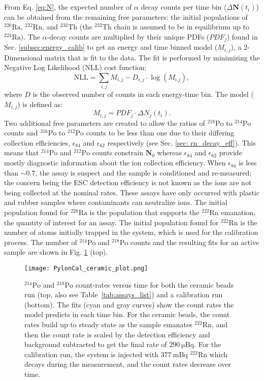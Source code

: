 \documentclass[final,3p,times]{elsarticle}
\newcommand{\matr}[1]{\mathbf{#1}}
\begin{document}
From Eq. \ref{eq:N}, the expected number of $\alpha$ decay counts per time bin ($\Delta \matr{N}(t_i)$) can be obtained from the remaining free parameters: the initial populations of $^{226}\text{Ra}$, $^{222}\text{Rn}$, and $^{232}\text{Th}$ (the $^{232}\text{Th}$ chain is assumed to be in equilibrium up to $^{224}\text{Ra})$.
The $\alpha$-decay counts are multiplied by their unique PDFs ($PDF_j$) found in Sec. \ref{subsec:energy_calib} to get an energy and time binned model ($M_{i,j}$), a 2-Dimensional matrix that is fit to the data.
The fit is performed by minimizing the Negative Log Likelihood (NLL) cost function:
\[
\text{NLL} = \sum_{i,j} M_{i,j} - D_{i,j} \cdot \log (M_{i.j}) ,
\]
where $D$ is the observed number of counts in each energy-time bin.
The model ($M_{i,j}$) is defined as:
\[ 
M_{i,j} = PDF_j \cdot \Delta N_j(t_i) .
\]
Two additional free parameters are created to allow the ratios of $^{218}\text{Po}$ to $^{214}\text{Po}$ counts and $^{216}\text{Po}$ to $^{212}\text{Po}$ counts to be less than one due to their differing collection efficiencies, $\epsilon_{84}$ and $\epsilon_{62}$ respectively (see Sec. \ref{sec: rn_decay_eff}). 
This means that $^{214}\text{Po}$ and $^{212}\text{Po}$ counts constrain $\matr{N}_0$ whereas $\epsilon_{84}$ and $\epsilon_{62}$ provide mostly diagnostic information about the ion collection efficiency.
When $\epsilon_{84}$ is less than $\sim 0.7$, the assay is suspect and the sample is conditioned and re-measured; the concern being the ESC detection efficiency is not known as the ions are not being collected at the nominal rates. 
These assays have only occurred with plastic and rubber samples where contaminants can neutralize ions.
The initial population found for $^{226}\text{Ra}$ is the population that supports the $^{222}\text{Rn}$ emanation, the quantity of interest for an assay. 
The initial population found for $^{222}\text{Rn}$ is the number of atoms initially trapped in the system, which is used for the calibration process.
The number of $^{214}\text{Po}$ and $^{218}\text{Po}$ counts and the resulting fits for an active sample  are shown in Fig. \ref{fig:pyl_ceram} (top).

\begin{figure}
    \centering
    \texttt{[image: PylonCal\_ceramic\_plot.png]}
    \caption{$^{214}\text{Po}$ and $^{218}\text{Po}$ count-rates versus time for both the ceramic beads run (top, also see Table~\ref{tab:assays_list}) and a calibration run (bottom). The fits (cyan and gray curves) show the count rates the model predicts in each time bin. For the ceramic beads, the count rates build up to steady state as the sample emanates $^{222}\text{Rn}$, and then the count rate is scaled by the detection efficiency and background subtracted to get the final rate of $290~\mathrm{\mu Bq}$. For the calibration run, the system is injected with $377~\mathrm{mBq}$ $^{222}\text{Rn}$ which decays during the measurement, and the count rates decrease over time.}
    \label{fig:pyl_ceram}
\end{figure}
\end{document}
